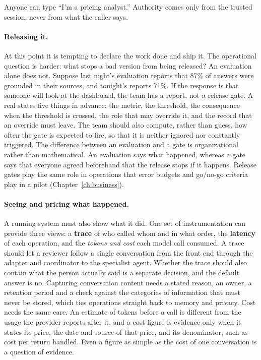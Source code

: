\begin{watchout}
Anyone can type ``I'm a pricing analyst.'' Authority comes only from the trusted session, never from what the caller says.
\end{watchout}

\paragraph{Releasing it.} At this point it is tempting to declare the work done and ship it. The operational question is harder: what stops a bad version from being released? An evaluation alone does not. Suppose last night's evaluation reports that 87\% of answers were grounded in their sources, and tonight's reports 71\%. If the response is that someone will look at the dashboard, the team has a report, not a release gate. A real  states five things in advance: the metric, the threshold, the consequence when the threshold is crossed, the role that may override it, and the record that an override must leave. The team should also compute, rather than guess, how often the gate is expected to fire, so that it is neither ignored nor constantly triggered. The difference between an evaluation and a gate is organizational rather than mathematical. An evaluation says what happened, whereas a gate says that everyone agreed beforehand that the release stops if it happens. Release gates play the same role in operations that error budgets and go/no-go criteria play in a pilot (Chapter~\ref{ch:business}).

\paragraph{Seeing and pricing what happened.} A running system must also show what it did. One set of instrumentation can provide three views: a \textbf{trace} of who called whom and in what order, the \textbf{latency} of each operation, and the \emph{tokens and cost} each model call consumed. A trace should let a reviewer follow a single conversation from the front end through the adapter and coordinator to the specialist agent. Whether the trace should also contain what the person actually said is a separate decision, and the default answer is no. Capturing conversation content needs a stated reason, an owner, a retention period and a check against the categories of information that must never be stored, which ties operations straight back to memory and privacy. Cost needs the same care. An estimate of tokens before a call is different from the usage the provider reports after it, and a cost figure is evidence only when it states its price, the date and source of that price, and its denominator, such as cost per return handled. Even a figure as simple as the cost of one conversation is a question of evidence.

